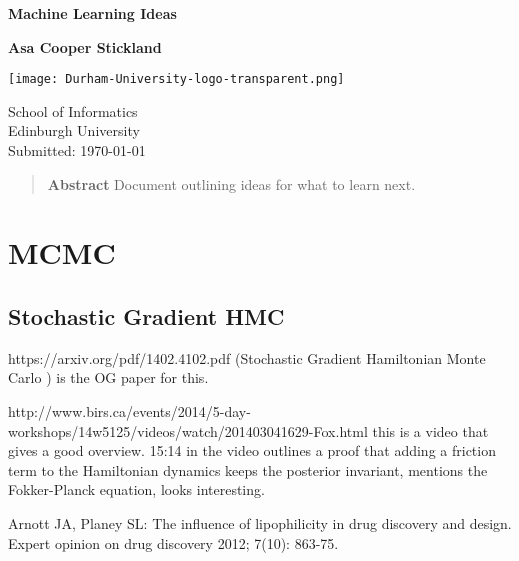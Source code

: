 \documentclass[12pt, onecolumn]{revtex4}    %
\begin{document}
                     
\begin{titlepage}
	\begin{center}
		\vspace*{1cm}
		
		\huge \textbf{Machine Learning Ideas}
		
		\vspace{0.5cm}

		
		\vspace{1.5cm}
		
		\textbf{Asa Cooper Stickland} \\
		
		
		\vfill
		
		
		
		\vspace{0.8cm}
		
		\texttt{[image: Durham-University-logo-transparent.png]}
		
		School of Informatics\\
		Edinburgh University\\
		Submitted: \today{}
		
	\end{center}
\end{titlepage}


\hrulefill
\begin{abstract}              
 
\textbf{Abstract} Document outlining ideas for what to learn next. 

\end{abstract}



\maketitle
\thispagestyle{plain} %
\newpage
\pagebreak
\tableofcontents
\pagebreak
\section{MCMC} 

\subsection{Stochastic Gradient HMC}

https://arxiv.org/pdf/1402.4102.pdf (Stochastic Gradient Hamiltonian Monte Carlo
) is the OG paper for this. 

http://www.birs.ca/events/2014/5-day-workshops/14w5125/videos/watch/201403041629-Fox.html this is a video that gives a good overview. 15:14 in the video outlines a proof that adding a friction term to the Hamiltonian dynamics keeps the posterior invariant, mentions the Fokker-Planck equation, looks interesting. 


\begin{thebibliography}{}
 Arnott JA, Planey SL: The influence of lipophilicity in drug discovery and design. Expert opinion on drug discovery 2012; 7(10): 863-75.




\end{thebibliography} 
\end{document}
